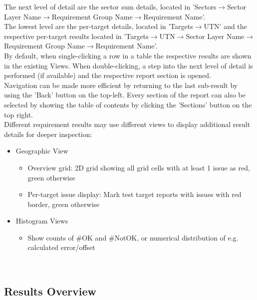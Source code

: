 The next level of detail are the sector sum details, located in 'Sectors$\rightarrow$Sector Layer Name$\rightarrow$Requirement Group Name$\rightarrow$Requirement Name'. \\

The lowest level are the per-target details, located in 'Targets$\rightarrow$UTN' and the respective per-target results located in 
'Targets$\rightarrow$UTN$\rightarrow$Sector Layer Name$\rightarrow$Requirement Group Name$\rightarrow$Requirement Name'. \\

By default, when single-clicking a row in a table the respective results are shown in the existing Views. When double-clicking, 
a step into the next level of detail is performed (if available) and the respective report section is opened. \\

Navigation can be made more efficient by returning to the last sub-result by using the 'Back' button on the top-left. 
Every section of the report can also be selected by showing the table of contents by clicking the 'Sections' button on the top right.\\

Different requirement results may use different views to display additional result details for deeper inspection:

\begin{itemize}  
\item Geographic View
\begin{itemize}  
\item Overview grid: 2D grid showing all grid cells with at least 1 issue as red, green otherwise
\item Per-target issue display: Mark test target reports with issues with red border, green otherwise
\end{itemize}
\item Histogram Views
\begin{itemize}  
\item Show counts of \#OK and \#NotOK, or numerical distribution of e.g. calculated error/offset
\end{itemize}
\end{itemize}
\ \\

\subsection{Results Overview}

